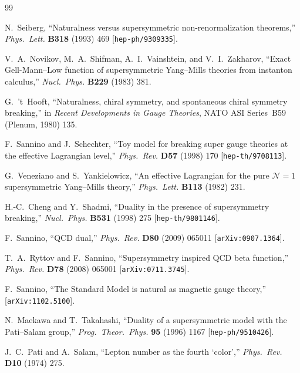 \documentclass[11pt,a4paper]{article}
\begin{document}
\begin{thebibliography}{99}

  N.~Seiberg,
  ``Naturalness versus supersymmetric non-renormalization theorems,''
  \textit{Phys.~Lett.} \textbf{B318} (1993) 469
  [\texttt{hep-ph/9309335}].

  V.~A.~Novikov, M.~A.~Shifman, A.~I.~Vainshtein, and
  V.~I.~Zakharov,
  ``Exact Gell-Mann--Low function of supersymmetric Yang--Mills
  theories from instanton calculus,''
  \textit{Nucl.~Phys.} \textbf{B229} (1983) 381.

  G.~'t~Hooft,
  ``Naturalness, chiral symmetry, and spontaneous chiral symmetry
  breaking,'' in \textit{Recent Developments in Gauge Theories},
  NATO ASI Series~B59 (Plenum, 1980) 135.

  F.~Sannino and J.~Schechter,
  ``Toy model for breaking super gauge theories at the effective
  Lagrangian level,''
  \textit{Phys.~Rev.} \textbf{D57} (1998) 170
  [\texttt{hep-th/9708113}].

  G.~Veneziano and S.~Yankielowicz,
  ``An effective Lagrangian for the pure $\mathcal{N}=1$
  supersymmetric Yang--Mills theory,''
  \textit{Phys.~Lett.} \textbf{B113} (1982) 231.

  H.-C.~Cheng and Y.~Shadmi,
  ``Duality in the presence of supersymmetry breaking,''
  \textit{Nucl.~Phys.} \textbf{B531} (1998) 275
  [\texttt{hep-th/9801146}].

  F.~Sannino,
  ``QCD dual,''
  \textit{Phys.~Rev.} \textbf{D80} (2009) 065011
  [\texttt{arXiv:0907.1364}].

  T.~A.~Ryttov and F.~Sannino,
  ``Supersymmetry inspired QCD beta function,''
  \textit{Phys.~Rev.} \textbf{D78} (2008) 065001
  [\texttt{arXiv:0711.3745}].

  F.~Sannino,
  ``The Standard Model is natural as magnetic gauge theory,''
  [\texttt{arXiv:1102.5100}].

  N.~Maekawa and T.~Takahashi,
  ``Duality of a supersymmetric model with the Pati--Salam group,''
  \textit{Prog.~Theor.~Phys.} \textbf{95} (1996) 1167
  [\texttt{hep-ph/9510426}].

  J.~C.~Pati and A.~Salam,
  ``Lepton number as the fourth `color',''
  \textit{Phys.~Rev.} \textbf{D10} (1974) 275.


\end{thebibliography}
\end{document}
